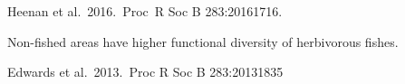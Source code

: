 \documentclass[t,handout]{beamer}  %
\begin{document}
%
%
{
	\begin{frame}[b]
	
	\hfill \tiny Heenan et al.~2016.~Proc~R Soc B 283:20161716. %
	
\end{frame}
}
%
{
\begin{frame}[b]{Non-fished areas have higher functional diversity of herbivorous fishes.}
	
	\hfill \tiny Edwards et al.~2013.~Proc R Soc B 283:20131835
	
\end{frame}
}
%

%
%
%
%	
%
%


%
%
%
%
%
%
%
%
\end{document}
